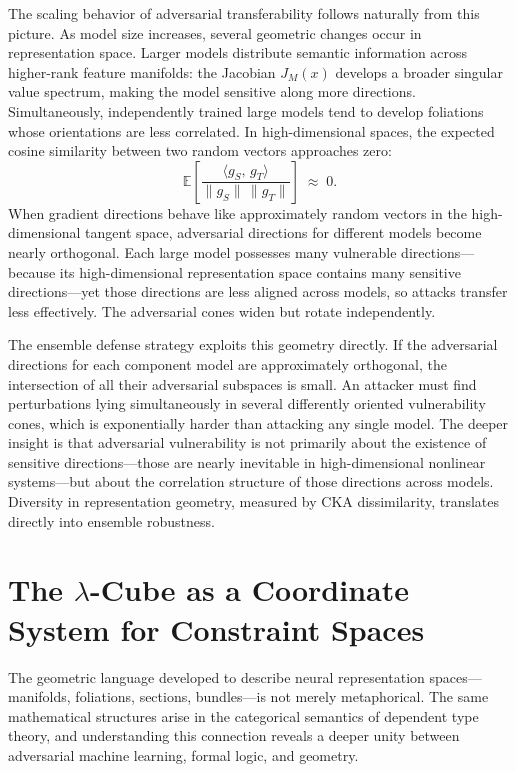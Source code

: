\documentclass[12pt,a4paper]{article}
\theoremstyle{plain}
\theoremstyle{definition}
\begin{document}
The scaling behavior of adversarial transferability follows naturally from this picture. As model size increases, several geometric changes occur in representation space. Larger models distribute semantic information across higher-rank feature manifolds: the Jacobian $J_M(x)$ develops a broader singular value spectrum, making the model sensitive along more directions. Simultaneously, independently trained large models tend to develop foliations whose orientations are less correlated. In high-dimensional spaces, the expected cosine similarity between two random vectors approaches zero:
\[
\mathbb{E}\!\left[\frac{\langle g_S,\, g_T\rangle}{\|g_S\|\,\|g_T\|}\right] \;\approx\; 0.
\]
When gradient directions behave like approximately random vectors in the high-dimensional tangent space, adversarial directions for different models become nearly orthogonal. Each large model possesses many vulnerable directions---because its high-dimensional representation space contains many sensitive directions---yet those directions are less aligned across models, so attacks transfer less effectively. The adversarial cones widen but rotate independently.

The ensemble defense strategy exploits this geometry directly. If the adversarial directions for each component model are approximately orthogonal, the intersection of all their adversarial subspaces is small. An attacker must find perturbations lying simultaneously in several differently oriented vulnerability cones, which is exponentially harder than attacking any single model. The deeper insight is that adversarial vulnerability is not primarily about the existence of sensitive directions---those are nearly inevitable in high-dimensional nonlinear systems---but about the correlation structure of those directions across models. Diversity in representation geometry, measured by CKA dissimilarity, translates directly into ensemble robustness.

\section{The $\lambda$-Cube as a Coordinate System for Constraint Spaces}

The geometric language developed to describe neural representation spaces---manifolds, foliations, sections, bundles---is not merely metaphorical. The same mathematical structures arise in the categorical semantics of dependent type theory, and understanding this connection reveals a deeper unity between adversarial machine learning, formal logic, and geometry.
\end{document}
